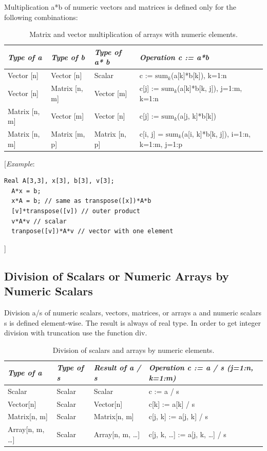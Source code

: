 \documentclass[10pt,a4paper]{report}
\def\doublelabel#1{\label{#1}\hypertarget{#1}{}}
\begin{document}
Multiplication a*b of numeric vectors and matrices is defined only for
the following combinations:


\begin{longtable}[]{|l|l|l|l|}
\caption{Matrix and vector multiplication of arrays with numeric elements.}\\
\hline
\emph{Type of a} & \emph{Type of b} & \emph{Type of a* b} &
\emph{Operation c := a*b}\\ \hline
\endhead
Vector {[}n{]} & Vector {[}n{]} & Scalar & c :=
$\textrm{sum}_k$(a{[}k{]}*b{[}k{]}), k=1:n\\ \hline
Vector {[}n{]} & Matrix {[}n, m{]} & Vector {[}m{]} & c{[}j{]} :=
$\textrm{sum}_k$(a{[}k{]}*b{[}k, j{]}), j=1:m, k=1:n\\ \hline
Matrix {[}n, m{]} & Vector {[}m{]} & Vector {[}n{]} & c{[}j{]} :=
$\textrm{sum}_k$(a{[}j, k{]}*b{[}k{]})\\ \hline
Matrix {[}n, m{]} & Matrix {[}m, p{]} & Matrix {[}n, p{]} & c{[}i, j{]}
= $\textrm{sum}_k$(a{[}i, k{]}*b{[}k, j{]}), i=1:n, k=1:m,
j=1:p\\ \hline

\end{longtable}

{[}\emph{Example}:

\begin{lstlisting}[language=modelica]
  Real A[3,3], x[3], b[3], v[3];
  A*x = b;
  x*A = b; // same as transpose([x])*A*b
  [v]*transpose([v]) // outer product
  v*A*v // scalar
  tranpose([v])*A*v // vector with one element
\end{lstlisting}
{]}

\subsection{Division of Scalars or Numeric Arrays by Numeric Scalars}\doublelabel{division-of-scalars-or-numeric-arrays-by-numeric-scalars}

Division a/s of numeric scalars, vectors, matrices, or arrays a and
numeric scalars s is defined element-wise. The result is always of real
type. In order to get integer division with truncation use the function
div.

\begin{longtable}[]{|l|l|l|l|}
\caption{Division of scalars and arrays by numeric elements.}\\
\hline
\endhead
\emph{Type of a} & \emph{Type of s} & \emph{Result of a / s} &
\emph{Operation c := a / s (j=1:n, k=1:m)}\\ \hline
Scalar & Scalar & Scalar & c := a / s\\ \hline
Vector{[}n{]} & Scalar & Vector{[}n{]} & c{[}k{]} := a{[}k{]} /
s\\ \hline
Matrix{[}n, m{]} & Scalar & Matrix{[}n, m{]} & c{[}j, k{]} := a{[}j,
k{]} / s\\ \hline
Array{[}n, m, \ldots{}{]} & Scalar & Array{[}n, m, \ldots{}{]} & c{[}j,
k, \ldots{}{]} := a{[}j, k, \ldots{}{]} / s\\ \hline

\end{longtable}
\end{document}
